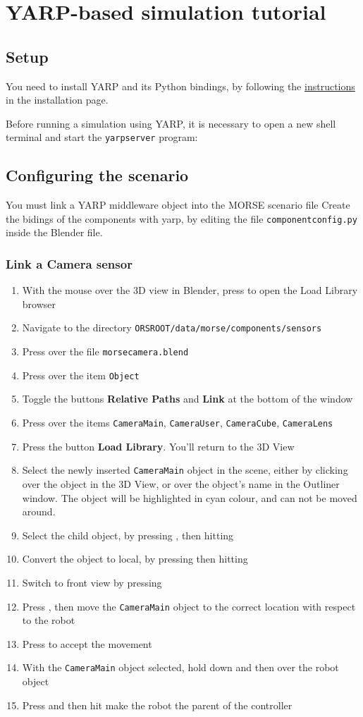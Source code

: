 \documentclass[twoside,a4paper,10pt]{report}
\newcommand{\dokutitlelevelone}[1]{\chapter{#1}}
\newcommand{\dokutitleleveltwo}[1]{\section{#1}}
\newcommand{\dokutitleleveltree}[1]{\subsection{#1}}
\newcommand{\dokubold}[1]{\textbf{#1}}
\newcommand{\dokumonospace}[1]{\texttt{#1}}
\newcommand{\dokuitem}{\item}
\begin{document}
\dokutitlelevelone{YARP-based simulation tutorial}
\label{46a8ae159056a35cad5aad3f96f08029}%
\label{1dd029a60f7f3dd1deaf993ce4538edf}%

\dokutitleleveltwo{Setup}
\label{a0f848942ce863cf53c0fa6cc684007d}%

You need to install YARP and its Python bindings, by following the \hyperref[ec46d0b85077d7a7fe8da2e2b4c70462]{ instructions} in the installation page.

Before running a simulation using YARP, it is necessary to open a new shell terminal and start the \dokumonospace{yarpserver} program:


\small
{}
\normalsize

\dokutitleleveltwo{Configuring the scenario}
\label{a5eb0127854ee2548f6841c01cbaee73}%

You must link a YARP middleware object into the MORSE scenario file
Create the bidings of the components with yarp, by editing the file \dokumonospace{component{\textunderscore}config.py} inside the Blender file.


\dokutitleleveltree{Link a Camera sensor}
\label{2e2e4de5af03ad71dd248a06e314e9d7}%

\begin{enumerate}\dokuitem  With the mouse over the 3D view in Blender, press  to open the Load Library browser
\dokuitem  Navigate to the directory \dokumonospace{{\textdollar}ORS{\textunderscore}ROOT/data/morse/components/sensors}
\dokuitem  Press  over the file \dokumonospace{morse{\textunderscore}camera.blend}
\dokuitem  Press  over the item \dokumonospace{Object}
\dokuitem  Toggle the buttons \dokubold{Relative Paths} and \dokubold{Link} at the bottom of the window
\dokuitem  Press  over the items \dokumonospace{CameraMain}, \dokumonospace{CameraUser}, \dokumonospace{CameraCube}, \dokumonospace{CameraLens}
\dokuitem  Press the button \dokubold{Load Library}. You'll return to the 3D View
\dokuitem  Select the newly inserted \dokumonospace{CameraMain} object in the scene, either by  clicking over the object in the 3D View, or  over the object's name in the Outliner window. The object will be highlighted in cyan colour, and can not be moved around.
\dokuitem  Select the child object, by pressing , then hitting 
\dokuitem  Convert the object to local, by pressing  then hitting 
\dokuitem  Switch to front view by pressing 
\dokuitem  Press , then move the \dokumonospace{CameraMain} object to the correct location with respect to the robot
\dokuitem  Press  to accept the movement
\dokuitem  With the \dokumonospace{CameraMain} object selected, hold down  and then  over the robot object
\dokuitem  Press  and then hit  make the robot the parent of the controller
\end{enumerate}
\end{document}
